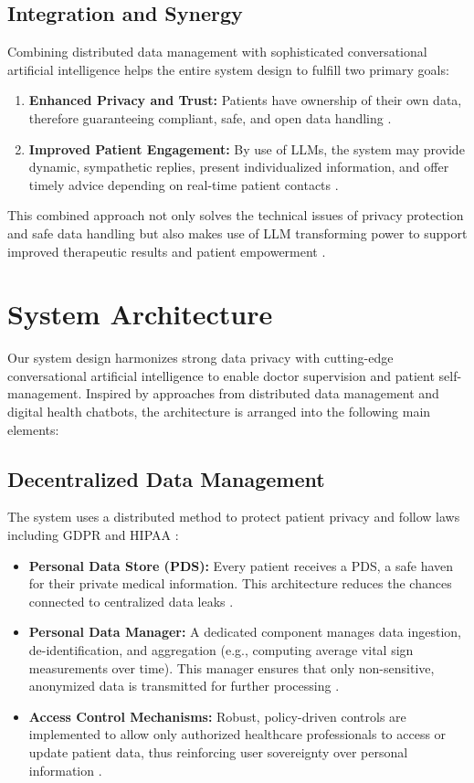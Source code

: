 \subsection{Integration and Synergy}
Combining distributed data management with sophisticated conversational artificial intelligence helps the entire system design to fulfill two primary goals:
\begin{enumerate}[itemsep=2em]
    \item \textbf{Enhanced Privacy and Trust:} Patients have ownership of their own data, therefore guaranteeing compliant, safe, and open data handling \cite{zichichi2022}.
    \item \textbf{Improved Patient Engagement:} By use of LLMs, the system may provide dynamic, sympathetic replies, present individualized information, and offer timely advice depending on real-time patient contacts \cite{gpt4tech, llama2023}.
\end{enumerate}
This combined approach not only solves the technical issues of privacy protection and safe data handling but also makes use of LLM transforming power to support improved therapeutic results and patient empowerment \cite{montagna2023}.

\section{System Architecture}
\label{sec:system_architecture}

Our system design harmonizes strong data privacy with cutting-edge conversational artificial intelligence to enable doctor supervision and patient self-management. Inspired by approaches from distributed data management and digital health chatbots, the architecture is arranged into the following main elements:

\subsection{Decentralized Data Management}
The system uses a distributed method to protect patient privacy and follow laws including GDPR \cite{eu2016} and HIPAA \cite{hipaa1996}:
\begin{itemize}[itemsep=2em]
    \item \textbf{Personal Data Store (PDS):} Every patient receives a PDS, a safe haven for their private medical information. This architecture reduces the chances connected to centralized data leaks \cite{zichichi2022}.
    \item \textbf{Personal Data Manager:} A dedicated component manages data ingestion, de-identification, and aggregation (e.g., computing average vital sign measurements over time). This manager ensures that only non-sensitive, anonymized data is transmitted for further processing \cite{zichichi2020b}.
    \item \textbf{Access Control Mechanisms:} Robust, policy-driven controls are implemented to allow only authorized healthcare professionals to access or update patient data, thus reinforcing user sovereignty over personal information \cite{zichichi2020a}.
\end{itemize}

